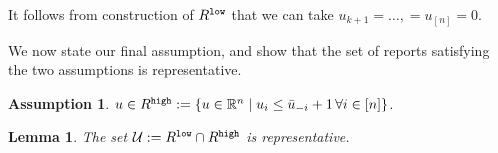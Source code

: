 \documentclass[12pt]{article}
\newcommand{\reals}{\mathbb{R}}
\newcommand{\U}{\mathcal{U}}
\newcommand{\Y}{\mathcal{Y}}
\newtheorem{lemma}{Lemma}
\newtheorem{assumption}{Assumption}
\begin{document}
It follows from construction of $R^{\tt low}$ that we can take $u_{k+1} = \ldots, = u_{[n]} = 0$.


We now state our final assumption, and show that the set of reports satisfying the two assumptions is representative.
\begin{assumption}\label{assum:top-threshold}
	$u \in R^{\tt high} := \{u \in \reals^n \mid u_i \leq \bar u_{-i} +1 \, \forall i \in [n]\}$.
\end{assumption}

\begin{lemma}\label{lem:top-threshold}
The set $\U := R^{\tt low} \cap R^{\tt high}$ is representative.
\end{lemma}
\end{document}
